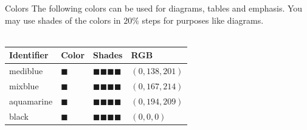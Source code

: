 \documentclass[aspectratio=1610,12pt]{beamer}
\begin{document}
\begin{frame}{Colors}
The following colors can be used for diagrams, tables and emphasis.
You may use shades of the colors in $20 \%$ steps for purposes like diagrams.\\
~\\
\centering
\scalebox{1.5}
{
\begin{tabulary}{\textwidth}{llll}
\toprule
Identifier	&Color					&Shades																		&RGB\\
\midrule
mediblue   	&\Huge\color{mediblue}$\blacksquare$	&\Huge\color{mediblue!80}$\blacksquare$\color{mediblue!60}$\blacksquare$\color{mediblue!40}$\blacksquare$\color{mediblue!20}$\blacksquare$	&$(0,138,201)$\\
mixblue   	&\Huge\color{mixblue}$\blacksquare$	&\Huge\color{mixblue!80}$\blacksquare$\color{mixblue!60}$\blacksquare$\color{mixblue!40}$\blacksquare$\color{mixblue!20}$\blacksquare$	&$(0,167,214)$\\
aquamarine	&\Huge\color{aquamarine}$\blacksquare$	&\Huge\color{aquamarine!80}$\blacksquare$\color{aquamarine!60}$\blacksquare$\color{aquamarine!40}$\blacksquare$\color{aquamarine!20}$\blacksquare$	&$(0,194,209)$\\
black		&\Huge\color{black}$\blacksquare$	&\Huge\color{black!80}$\blacksquare$\color{black!60}$\blacksquare$\color{black!40}$\blacksquare$\color{black!20}$\blacksquare$	&$(0,0,0)$\\
\bottomrule
\end{tabulary}
}
\end{frame}
\fi
\end{document}

